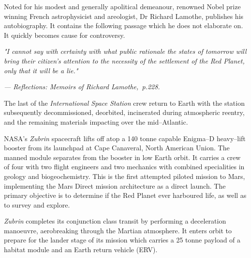 

Noted for his modest and generally apolitical demeanour, renowned Nobel prize winning French astrophysicist and areologist, Dr Richard Lamothe, publishes his autobiography. It contains the following passage which he does not elaborate on. It quickly becomes cause for controversy.

\startTimelineGeneralDocument
{\it "I cannot say with certainty with what public rationale the states of tomorrow will bring their citizen's attention to the necessity of the settlement of the Red Planet, only that it will be a lie."}

\hskip 1.5cm {\it --- Reflections: Memoirs of Richard Lamothe,~p.228.}
\stopTimelineGeneralDocument
\StopTimelineDate

The last of the {\it International Space Station} crew return to Earth with the station subsequently decommissioned, deorbited, incinerated during atmospheric reentry, and the remaining materials impacting over the mid--Atlantic.
\StopTimelineDate

NASA's {\it Zubrin} spacecraft lifts off atop a 140 tonne capable Enigma--D heavy--lift booster from its launchpad at Cape Canaveral, North American Union. The manned module separates from the booster in low Earth orbit. It carries a crew of four with two flight engineers and two mechanics with combined specialities in geology and biogeochemistry. This is the first attempted piloted mission to Mars, implementing the Mars Direct mission architecture as a direct launch. The primary objective is to determine if the Red Planet ever harboured life, as well as to survey and explore.
\StopTimelineDate

{\it Zubrin} completes its conjunction class transit by performing a deceleration manoeuvre, aerobreaking through the Martian atmosphere. It enters orbit to prepare for the lander stage of its mission which carries a 25 tonne payload of a habitat module and an Earth return vehicle (ERV).
\StopTimelineDate

